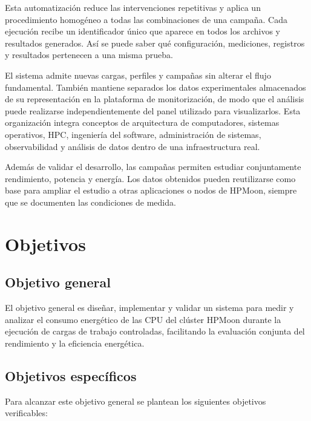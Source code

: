 Esta automatización reduce las intervenciones repetitivas y aplica un procedimiento homogéneo a todas las combinaciones de una campaña. Cada ejecución recibe un identificador único que aparece en todos los archivos y resultados generados. Así se puede saber qué configuración, mediciones, registros y resultados pertenecen a una misma prueba.

El sistema admite nuevas cargas, perfiles y campañas sin alterar el flujo fundamental. También mantiene separados los datos experimentales almacenados de su representación en la plataforma de monitorización, de modo que el análisis puede realizarse independientemente del panel utilizado para visualizarlos. Esta organización integra conceptos de arquitectura de computadores, sistemas operativos, HPC, ingeniería del software, administración de sistemas, observabilidad y análisis de datos dentro de una infraestructura real.

Además de validar el desarrollo, las campañas permiten estudiar conjuntamente rendimiento, potencia y energía. Los datos obtenidos pueden reutilizarse como base para ampliar el estudio a otras aplicaciones o nodos de HPMoon, siempre que se documenten las condiciones de medida.

\section{Objetivos}
\label{sec:introduccion_objetivos}

\subsection{Objetivo general}
\label{subsec:objetivo_general}

El objetivo general es diseñar, implementar y validar un sistema para medir y analizar el consumo energético de las CPU del clúster HPMoon durante la ejecución de cargas de trabajo controladas, facilitando la evaluación conjunta del rendimiento y la eficiencia energética.

\subsection{Objetivos específicos}
\label{subsec:objetivos_especificos}

Para alcanzar este objetivo general se plantean los siguientes objetivos verificables:


